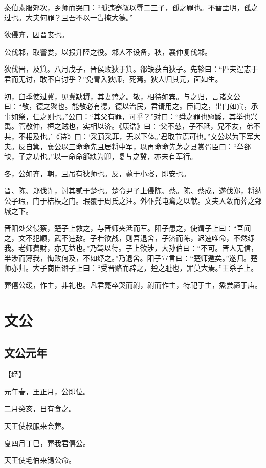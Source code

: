 \documentclass[a4paper,12pt,UTF8,twoside]{ctexbook}
\begin{document}
秦伯素服郊次，乡师而哭曰：“孤违蹇叔以辱二三子，孤之罪也。不替孟明，孤之过也。大夫何罪？且吾不以一眚掩大德。”

狄侵齐，因晋丧也。

公伐邾，取訾娄，以报升陉之役。邾人不设备，秋，襄仲复伐邾。

狄伐晋，及箕。八月戊子，晋侯败狄于箕。郤缺获白狄子。先轸曰：“匹夫逞志于君而无讨，敢不自讨乎？”免胄入狄师，死焉。狄人归其元，面如生。

初，臼季使过冀，见冀缺耨，其妻馌之。敬，相待如宾。与之归，言诸文公曰：“敬，德之聚也。能敬必有德，德以治民，君请用之。臣闻之，出门如宾，承事如祭，仁之则也。”公曰：“其父有罪，可乎？”对曰：“舜之罪也殛鲧，其举也兴禹。管敬仲，桓之贼也，实相以济。《康诰》曰：‘父不慈，子不祗，兄不友，弟不共，不相及也。’《诗》曰：‘采葑采菲，无以下体。’君取节焉可也。”文公以为下军大夫。反自箕，襄公以三命命先且居将中军，以再命命先茅之县赏胥臣曰：“举郤缺，子之功也。”以一命命郤缺为卿，复与之冀，亦未有军行。

冬，公如齐，朝，且吊有狄师也。反，薨于小寝，即安也。

晋、陈、郑伐许，讨其贰于楚也。楚令尹子上侵陈、蔡。陈、蔡成，遂伐郑，将纳公子瑕，门于桔柣之门。瑕覆于周氏之汪。外仆髠屯禽之以献。文夫人敛而葬之郐城之下。

晋阳处父侵蔡，楚子上救之，与晋师夹泜而军。阳子患之，使谓子上曰：“吾闻之，文不犯顺，武不违敌。子若欲战，则吾退舍，子济而陈，迟速唯命，不然纾我。老师费财，亦无益也。”乃驾以待。子上欲涉，大孙伯曰：“不可。晋人无信，半涉而薄我，悔败何及，不如纾之。”乃退舍。阳子宣言曰：“楚师遁矣。”遂归。楚师亦归。大子商臣谮子上曰：“受晋赂而辟之，楚之耻也，罪莫大焉。”王杀子上。

葬僖公缓，作主，非礼也。凡君薨卒哭而祔，祔而作主，特祀于主，烝尝禘于庙。


\chapter{文公}

\section{文公元年}



【经】

元年春，王正月，公即位。

二月癸亥，日有食之。

天王使叔服来会葬。

夏四月丁巳，葬我君僖公。

天王使毛伯来锡公命。
\end{document}
